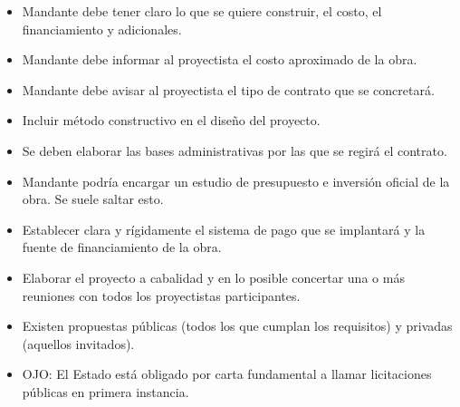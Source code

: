 \documentclass{article} %
\begin{document}
\begin{itemize}[label={},left=0pt,align=parleft]
    \begin{itemize}[label={},left=1em,align=parleft]
        \item \begin{highlightbox}[leveltwo] Mandante debe tener claro lo que se quiere construir, el costo, el financiamiento y adicionales. \end{highlightbox}
        \item \begin{highlightbox}[leveltwo] Mandante debe informar al proyectista el costo aproximado de la obra. \end{highlightbox}
        \item \begin{highlightbox}[leveltwo] Mandante debe avisar al proyectista el tipo de contrato que se concretará. \end{highlightbox}
        \item \begin{highlightbox}[leveltwo] Incluir método constructivo en el diseño del proyecto. \end{highlightbox}
        \item \begin{highlightbox}[leveltwo] Se deben elaborar las bases administrativas por las que se regirá el contrato. \end{highlightbox}
        \item \begin{highlightbox}[leveltwo] Mandante podría encargar un estudio de presupuesto e inversión oficial de la obra. Se suele saltar esto. \end{highlightbox}
        \item \begin{highlightbox}[leveltwo] Establecer clara y rígidamente el sistema de pago que se implantará y la fuente de financiamiento de la obra. \end{highlightbox}
        \item \begin{highlightbox}[leveltwo] Elaborar el proyecto a cabalidad y en lo posible concertar una o más reuniones con todos los proyectistas participantes. \end{highlightbox}
        \item \begin{highlightbox}[leveltwo] Existen propuestas públicas (todos los que cumplan los requisitos) y privadas (aquellos invitados). \end{highlightbox}
        \item \begin{highlightbox}[leveltwo] OJO: El Estado está obligado por carta fundamental a llamar licitaciones públicas en primera instancia. \end{highlightbox}

\end{itemize}
\end{itemize}
\end{document}
